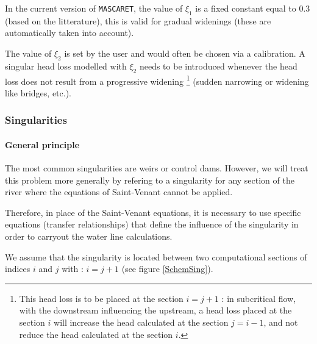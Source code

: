 \vspace{0.5cm}

In the current version of \texttt{MASCARET}, the value of $\xi_1$ is a fixed constant equal to 0.3 (based on the litterature), this is valid for gradual widenings (these are automatically taken into account).

\vspace{0.5cm}

The value of $\xi_2$ is set by the user and would often be chosen via a calibration. 
A singular head loss modelled with $\xi_2$ needs to be introduced whenever the head loss does not result from a progressive widening 
\footnote{This head loss is to be placed at the section $i = j + 1$ : in subcritical flow, with the downstream influencing the upstream, a head loss placed at the section $i$ will increase the head calculated at the section $j = i - 1$, and not reduce the head calculated at the section $i$.} 
(sudden narrowing or widening like bridges, etc.).



\subsubsection{Singularities} \label{singu}

\paragraph{General principle\\}

\hspace*{1cm}

The most common singularities are weirs or control dams. However, we will treat this problem more generally by refering to a singularity for any section of the river where the equations of Saint-Venant cannot be applied.

\vspace{0.5cm}

Therefore, in place of the Saint-Venant equations, it is necessary to use specific equations (transfer relationships) that define the influence of the singularity in order to carryout the water line calculations.

\vspace{0.5cm}

We assume that the singularity is located between two computational sections of indices $i$ and $j$ with : $i = j + 1$ (see figure \ref{SchemSing}).


